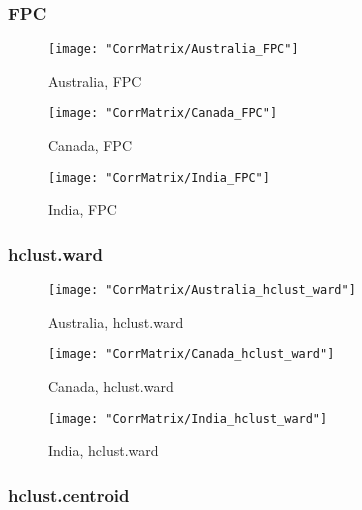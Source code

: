 \documentclass[a4paper]{article}
\begin{document}
\subsubsection{FPC}

\begin{figure}[H]
\begin{center}
\texttt{[image: "CorrMatrix/Australia\_FPC"]}
\caption{Australia,  FPC}
\label{fig:2}
\end{center}
\end{figure}

\begin{figure}[H]
\begin{center}
\texttt{[image: "CorrMatrix/Canada\_FPC"]}
\caption{Canada,  FPC}
\label{fig:2}
\end{center}
\end{figure}

\begin{figure}[H]
\begin{center}
\texttt{[image: "CorrMatrix/India\_FPC"]}
\caption{India,  FPC}
\label{fig:2}
\end{center}
\end{figure}

\subsubsection{hclust.ward}

\begin{figure}[H]
\begin{center}
\texttt{[image: "CorrMatrix/Australia\_hclust\_ward"]}
\caption{Australia,  hclust.ward}
\label{fig:2}
\end{center}
\end{figure}

\begin{figure}[H]
\begin{center}
\texttt{[image: "CorrMatrix/Canada\_hclust\_ward"]}
\caption{Canada,  hclust.ward}
\label{fig:2}
\end{center}
\end{figure}

\begin{figure}[H]
\begin{center}
\texttt{[image: "CorrMatrix/India\_hclust\_ward"]}
\caption{India,  hclust.ward}
\label{fig:2}
\end{center}
\end{figure}

\subsubsection{hclust.centroid}
\end{document}
